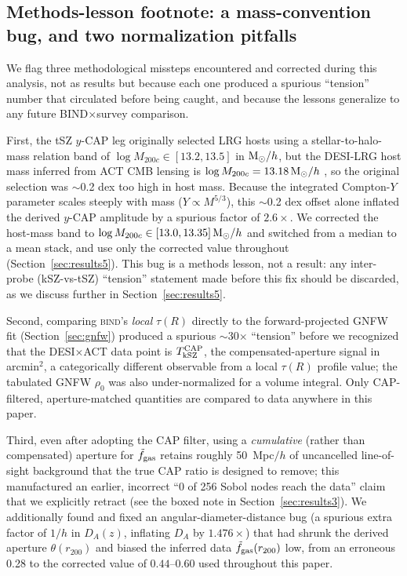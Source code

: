 \documentclass[11pt]{article}
\newcommand{\bind}{\textsc{bind}}
\newcommand{\fgt}{\tilde{f}_{\rm gas}}          %
\newcommand{\Msun}{{\rm M}_\odot}
\newcommand{\Mhalo}{M_{200c}}
\begin{document}
\subsection{Methods-lesson footnote: a mass-convention bug, and two normalization pitfalls}\label{sec:pitfalls}

We flag three methodological missteps encountered and corrected during this
analysis, not as results but because each one produced a spurious ``tension''
number that circulated before being caught, and because the lessons generalize
to any future BIND$\times$survey comparison.

First, the tSZ $y$-CAP leg originally selected LRG hosts using a stellar-to-halo-mass
relation band of $\log \Mhalo\in[13.2,13.5]$ in $\Msun/h$, but the DESI-LRG
host mass inferred from ACT CMB lensing is $\log \Mhalo=13.18\,\Msun/h$
\citep{sailer24}, so the original selection was $\sim$0.2 dex too high in host
mass. %
Because the integrated Compton-$Y$ parameter scales steeply with mass
($Y\propto M^{5/3}$), this $\sim$0.2 dex offset alone inflated the derived
$y$-CAP amplitude by a spurious factor of $2.6\times$. %
We corrected the host-mass band to $\log \Mhalo\in[13.0,13.35]\,\Msun/h$ and
switched from a median to a mean stack, and use only the corrected value
throughout (Section~\ref{sec:results5}). This bug is a methods lesson, not a
result: any inter-probe (kSZ-vs-tSZ) ``tension'' statement made before this fix
should be discarded, as we discuss further in Section~\ref{sec:results5}.

Second, comparing \bind's \emph{local} $\tau(R)$ directly to the forward-projected
GNFW fit (Section~\ref{sec:gnfw}) produced a spurious $\sim$30$\times$
``tension'' before we recognized that the DESI$\times$ACT data point is
$T_{\rm kSZ}^{\rm CAP}$, the compensated-aperture signal in arcmin$^2$, a
categorically different observable from a local $\tau(R)$ profile value; the
tabulated GNFW $\rho_0$ was also under-normalized for a volume integral. %
Only CAP-filtered, aperture-matched quantities are compared to data anywhere
in this paper.

Third, even after adopting the CAP filter, using a \emph{cumulative} (rather
than compensated) aperture for $\fgt$ retains roughly 50~Mpc$/h$ of
uncancelled line-of-sight background that the true CAP ratio is designed to
remove; this manufactured an earlier, incorrect ``0 of 256 Sobol nodes reach
the data'' claim that we explicitly retract (see the boxed note in
Section~\ref{sec:results3}). We additionally found and fixed an
angular-diameter-distance bug (a spurious extra factor of $1/h$ in $D_A(z)$,
inflating $D_A$ by $1.476\times$) that had shrunk the derived aperture
$\theta(r_{200})$ and biased the inferred data $\fgt(r_{200})$ low, from an
erroneous 0.28 to the corrected value of $0.44$--$0.60$ used throughout this
paper. %
\end{document}

